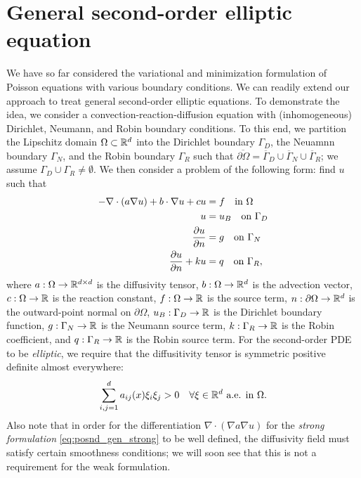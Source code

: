 \section{General second-order elliptic equation}
We have so far considered the variational and minimization formulation of Poisson equations with various boundary conditions. We can readily extend our approach to treat general second-order elliptic equations. To demonstrate the idea, we consider a convection-reaction-diffusion equation with (inhomogeneous) Dirichlet, Neumann, and Robin boundary conditions. To this end, we partition the Lipschitz domain $\Omega \subset \mathbb{R}^d$ into the Dirichlet boundary $\Gamma_D$, the Neuamnn boundary $\Gamma_N$, and the Robin boundary $\Gamma_R$ such that $\overline{\partial \Omega} = \overline{\Gamma}_D \cup \overline{\Gamma}_N \cup \overline{\Gamma}_R$; we assume $\Gamma_D \cup \Gamma_R \neq \emptyset$. We then consider a problem of the following form: find $u$ such that
\begin{align}
  - \nabla \cdot (a \nabla u) + b \cdot \nabla u + c u &= f \quad \text{in } \Omega
  \notag \\
  u &= u_B \quad \text{on } \Gamma_D \label{eq:posnd_gen_strong} \\
  \frac{\partial u}{\partial n} &= g \quad \text{on } \Gamma_N \notag \\
  \frac{\partial u}{\partial n}+ k u &= q \quad \text{on } \Gamma_R, \notag
\end{align}
where $a: \Omega \to \mathbb{R}^{d \times d}$ is the diffusivity tensor, $b: \Omega \to \mathbb{R}^d$ is the advection vector, $c: \Omega \to \mathbb{R}$ is the reaction constant, $f: \Omega \to \mathbb{R}$ is the source term,  $n: \partial \Omega \to \mathbb{R}^d$ is the outward-point normal on $\partial \Omega$, $u_B: \Gamma_D \to \mathbb{R}$ is the Dirichlet boundary function, $g: \Gamma_N \to \mathbb{R}$ is the Neumann source term, $k: \Gamma_R \to \mathbb{R}$ is the Robin coefficient, and $q: \Gamma_R \to \mathbb{R}$ is the Robin source term.  For the second-order PDE to be \emph{elliptic}, we require that the diffusitivity tensor is symmetric positive definite almost everywhere:
\begin{equation*}
  \sum_{i,j=1}^d a_{ij}(x) \xi_i \xi_j > 0 \quad \forall \xi \in \mathbb{R}^d \text{ a.e. in } \Omega.
\end{equation*}
Also note that in order for the differentiation $\nabla \cdot (\nabla a \nabla u)$ for the \emph{strong formulation} \eqref{eq:posnd_gen_strong} to be well defined, the diffusivity field must satisfy certain smoothness conditions; we will soon see that this is not a requirement for the weak formulation.

